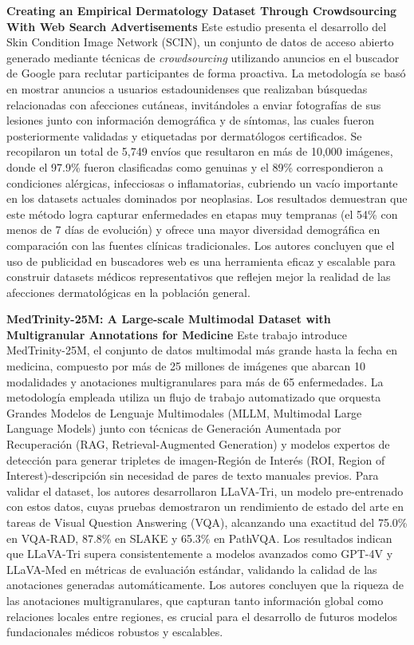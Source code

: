 \documentclass[11pt, a4paper]{article}
\begin{document}
\textbf{Creating an Empirical Dermatology Dataset Through Crowdsourcing With Web Search Advertisements} \cite{ward_creating_2024}
Este estudio presenta el desarrollo del Skin Condition Image Network (SCIN), un conjunto de datos de acceso abierto generado mediante técnicas de \textit{crowdsourcing} utilizando anuncios en el buscador de Google para reclutar
participantes de forma proactiva. La metodología se basó en mostrar anuncios a usuarios estadounidenses que realizaban búsquedas relacionadas con afecciones cutáneas, invitándoles a enviar fotografías de sus lesiones junto con información
demográfica y de síntomas, las cuales fueron posteriormente validadas y etiquetadas por dermatólogos certificados. Se recopilaron un total de 5,749 envíos que resultaron en más de 10,000 imágenes, donde el 97.9\% fueron clasificadas como
genuinas y el 89\% correspondieron a condiciones alérgicas, infecciosas o inflamatorias, cubriendo un vacío importante en los datasets actuales dominados por neoplasias. Los resultados demuestran que este método logra capturar 
enfermedades en etapas muy tempranas (el 54\% con menos de 7 días de evolución) y ofrece una mayor diversidad demográfica en comparación con las fuentes clínicas tradicionales. Los autores concluyen que el uso de publicidad en buscadores
web es una herramienta eficaz y escalable para construir datasets médicos representativos que reflejen mejor la realidad de las afecciones dermatológicas en la población general.

\textbf{MedTrinity-25M: A Large-scale Multimodal Dataset with Multigranular Annotations for Medicine} \cite{xie_medtrinity-25m_2025}
Este trabajo introduce MedTrinity-25M, el conjunto de datos multimodal más grande hasta la fecha en medicina, compuesto por más de 25 millones de imágenes que abarcan 10 modalidades y anotaciones multigranulares para más de 65 enfermedades.
La metodología empleada utiliza un flujo de trabajo automatizado que orquesta Grandes Modelos de Lenguaje Multimodales (MLLM, Multimodal Large Language Models) junto con técnicas de Generación Aumentada por Recuperación 
(RAG, Retrieval-Augmented Generation) y modelos expertos de detección para generar tripletes de imagen-Región de Interés (ROI, Region of Interest)-descripción sin necesidad de pares de texto manuales previos. Para validar el dataset, los
autores desarrollaron LLaVA-Tri, un modelo pre-entrenado con estos datos, cuyas pruebas demostraron un rendimiento de estado del arte en tareas de Visual Question Answering (VQA), alcanzando una exactitud del 75.0\% en VQA-RAD, 87.8\% en
SLAKE y 65.3\% en PathVQA. Los resultados indican que LLaVA-Tri supera consistentemente a modelos avanzados como GPT-4V y LLaVA-Med en métricas de evaluación estándar, validando la calidad de las anotaciones generadas automáticamente.
Los autores concluyen que la riqueza de las anotaciones multigranulares, que capturan tanto información global como relaciones locales entre regiones, es crucial para el desarrollo de futuros modelos fundacionales médicos robustos y 
escalables.
\end{document}
